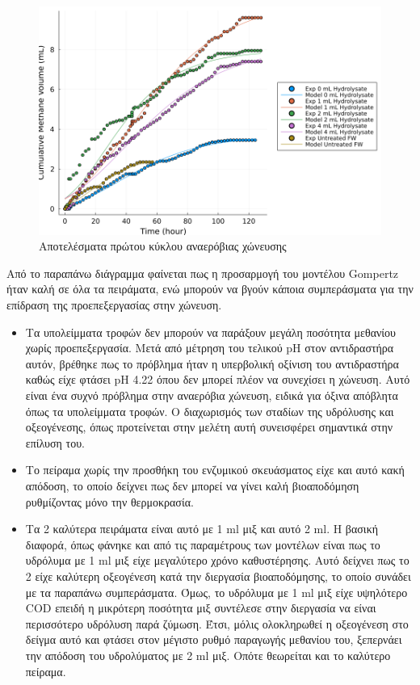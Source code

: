 \documentclass[11pt]{article}
\begin{document}
\begin{figure}[htbp]
\centering
\includegraphics[width=.9\linewidth]{../plots/BMPs/methane_s1_r2_comp.png}
\caption{Αποτελέσματα πρώτου κύκλου αναερόβιας χώνευσης}
\end{figure}

Από το παραπάνω διάγραμμα φαίνεται πως η προσαρμογή του μοντέλου Gompertz ήταν καλή σε όλα τα πειράματα, ενώ μπορούν να βγούν κάποια συμπεράσματα για την επίδραση της προεπεξεργασίας στην χώνευση.

\begin{itemize}
\item Τα υπολείμματα τροφών δεν μπορούν να παράξουν μεγάλη ποσότητα μεθανίου χωρίς προεπεξεργασία. Μετά από μέτρηση του τελικού pH στον αντιδραστήρα αυτόν, βρέθηκε πως το πρόβλημα ήταν η υπερβολική οξίνιση του αντιδραστήρα καθώς είχε φτάσει pH 4.22 όπου δεν μπορεί πλέον να συνεχίσει η χώνευση. Αυτό είναι ένα συχνό πρόβλημα στην αναερόβια χώνευση, ειδικά για όξινα απόβλητα όπως τα υπολείμματα τροφών. Ο διαχωρισμός των σταδίων της υδρόλυσης και οξεογένεσης, όπως προτείνεται στην μελέτη αυτή συνεισφέρει σημαντικά στην επίλυση του.
\item Το πείραμα χωρίς την προσθήκη του ενζυμικού σκευάσματος είχε και αυτό κακή απόδοση, το οποίο δείχνει πως δεν μπορεί να γίνει καλή βιοαποδόμηση ρυθμίζοντας μόνο την θερμοκρασία.
\item Τα 2 καλύτερα πειράματα είναι αυτό με 1 ml μιξ και αυτό 2 ml. Η βασική διαφορά, όπως φάνηκε και από τις παραμέτρους των μοντέλων είναι πως το υδρόλυμα με 1 ml μιξ είχε μεγαλύτερο χρόνο καθυστέρησης. Αυτό δείχνει πως το 2 είχε καλύτερη οξεογένεση κατά την διεργασία βιοαποδόμησης, το οποίο συνάδει με τα παραπάνω συμπεράσματα. Όμως, το υδρόλυμα με 1 ml μιξ είχε υψηλότερο COD επειδή η μικρότερη ποσότητα μιξ συντέλεσε στην διεργασία να είναι περισσότερο υδρόλυση παρά ζύμωση. Έτσι, μόλις ολοκληρωθεί η οξεογένεση στο δείγμα αυτό και φτάσει στον μέγιστο ρυθμό παραγωγής μεθανίου του, ξεπερνάει την απόδοση του υδρολύματος με 2 ml μιξ. Οπότε θεωρείται και το καλύτερο πείραμα.
\end{itemize}
\end{document}
